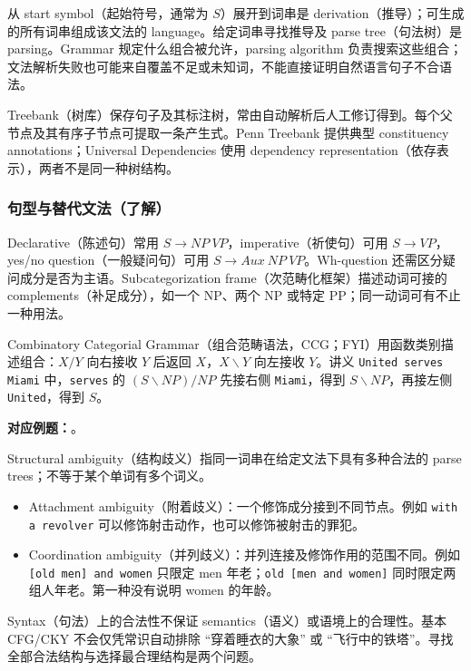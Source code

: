 从 start symbol（起始符号，通常为 $S$）展开到词串是 derivation（推导）；可生成的所有词串组成该文法的 language。给定词串寻找推导及 parse tree（句法树）是 parsing。Grammar 规定什么组合被允许，parsing algorithm 负责搜索这些组合；文法解析失败也可能来自覆盖不足或未知词，不能直接证明自然语言句子不合语法。

Treebank（树库）保存句子及其标注树，常由自动解析后人工修订得到。每个父节点及其有序子节点可提取一条产生式。Penn Treebank 提供典型 constituency annotations；Universal Dependencies 使用 dependency representation（依存表示），两者不是同一种树结构。

\subsubsection{句型与替代文法（了解）}

Declarative（陈述句）常用 $S\rightarrow NP\ VP$，imperative（祈使句）可用 $S\rightarrow VP$，yes/no question（一般疑问句）可用 $S\rightarrow Aux\ NP\ VP$。Wh-question 还需区分疑问成分是否为主语。Subcategorization frame（次范畴化框架）描述动词可接的 complements（补足成分），如一个 NP、两个 NP 或特定 PP；同一动词可有不止一种用法。

Combinatory Categorial Grammar（组合范畴语法，CCG；FYI）用函数类别描述组合：$X/Y$ 向右接收 $Y$ 后返回 $X$，$X\backslash Y$ 向左接收 $Y$。讲义 \texttt{United serves Miami} 中，\texttt{serves} 的 $(S\backslash NP)/NP$ 先接右侧 \texttt{Miami}，得到 $S\backslash NP$，再接左侧 \texttt{United}，得到 $S$。

\textbf{对应例题：}。


Structural ambiguity（结构歧义）指同一词串在给定文法下具有多种合法的 parse trees；不等于某个单词有多个词义。

\begin{itemize}
  \item Attachment ambiguity（附着歧义）：一个修饰成分接到不同节点。例如 \texttt{with a revolver} 可以修饰射击动作，也可以修饰被射击的罪犯。
  \item Coordination ambiguity（并列歧义）：并列连接及修饰作用的范围不同。例如 \texttt{[old men] and women} 只限定 men 年老；\texttt{old [men and women]} 同时限定两组人年老。第一种没有说明 women 的年龄。
\end{itemize}

Syntax（句法）上的合法性不保证 semantics（语义）或语境上的合理性。基本 CFG/CKY 不会仅凭常识自动排除 ``穿着睡衣的大象'' 或 ``飞行中的铁塔''。寻找全部合法结构与选择最合理结构是两个问题。


